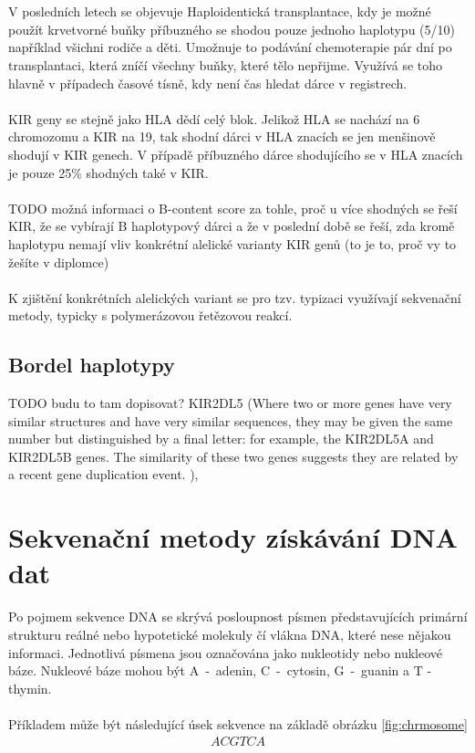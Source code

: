 \documentclass[czech,DP]{thesiskiv}
\numberwithin{equation}{section}
\begin{document}
\\
\\
V posledních letech se objevuje Haploidentická transplantace, kdy je možné použít krvetvorné buňky příbuzného se shodou pouze jednoho haplotypu (5/10) například všichni rodiče a děti. Umožnuje to podávání chemoterapie pár dní po transplantaci, která zníčí všechny buňky, které tělo nepřijme. Využívá se toho hlavně v případech časové tísně, kdy není čas hledat dárce v registrech. \cite{haploidenticka_transplantace}
\\
\\
KIR geny se stejně jako HLA dědí celý blok. Jelikož HLA se nachází na 6 chromozomu a KIR na 19, tak shodní dárci v HLA znacích se jen menšinově shodují v KIR genech. V případě příbuzného dárce shodujícího se v HLA znacích je pouze 25\% shodných také v KIR. \cite{KIR_haplotypy}
\\
\\
TODO možná informaci o B-content score za tohle, proč u více shodných se řeší KIR, že se vybírají B haplotypový dárci a že v poslední době se řeší, zda kromě haplotypu nemají vliv konkrétní alelické varianty KIR genů (to je to, proč vy to žešíte v diplomce)
\\
\\
K zjištění konkrétních alelických variant se pro tzv. typizaci využívají sekvenační metody, typicky s polymerázovou řetězovou reakcí. 


\section{Bordel haplotypy}

TODO budu to tam dopisovat? KIR2DL5 (Where two or more genes have very similar structures and have very similar sequences, they may be given the same number but distinguished by a final letter: for example, the KIR2DL5A and KIR2DL5B genes. The similarity of these two genes suggests they are related by a recent gene duplication event. ),




\chapter{Sekvenační metody získávání DNA dat}
Po pojmem sekvence DNA se skrývá posloupnost písmen představujících primární strukturu reálné nebo hypotetické molekuly čí vlákna DNA, které nese nějakou informaci. Jednotlivá písmena jsou označována jako nukleotidy nebo nukleové báze. Nukleové báze mohou být A~-~adenin, C~-~cytosin, G~-~guanin a T - thymin. \cite{genome_gov}
\\
\\
\noindent
Příkladem může být následující úsek sekvence na základě obrázku \ref{fig:chrmosome} 
\begin{align}
   \label{sekvence_prikad} ACGTCA
\end{align}
\end{document}
